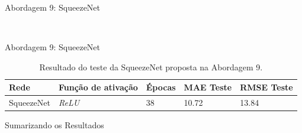 \begin{frame}{Abordagem 9: SqueezeNet}
\begin{figure}[h!]
\begin{subfigure}[hb]{0.5\linewidth}
		\end{subfigure}\\
	\end{figure}
\end{frame}

\begin{frame}{Abordagem 9: SqueezeNet}
  \begin{table}[!ht]
	\centering
	\caption{Resultado do teste da SqueezeNet proposta na Abordagem 9.}
	\label{tab:results-9}
		\begin{tabular}{l l l l l }
			\toprule
			Rede & Função de ativação & Épocas & MAE Teste & RMSE Teste \\
			\midrule
			SqueezeNet & \emph{ReLU} & 38 & 10.72 & 13.84 \\
			\bottomrule
		\end{tabular}
	\end{table}
\end{frame}



\begin{frame}{Sumarizando os Resultados}
  
\end{frame}
